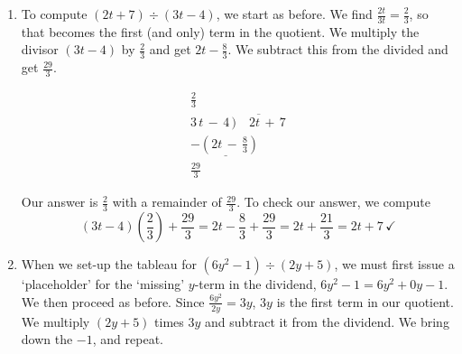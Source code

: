 \documentclass{ximera}
\begin{document}
\begin{example}
\begin{explanation}
\begin{enumerate}
Finally, we `bring down' the last term of the dividend, namely $-14$, and repeat the process.  We divide $\frac{7x}{x} = 7$, add this to the quotient, multiply it by the divisor (which yields $7(x - 2) = 7x - 14$) and subtract.

\[
\begin{array}{r}
x^2\,+\,6x\,+\,7\\
x\,-\,2 \, \overline{)\quad x^3\,+\,4x^2\,-\,5x\,-\,14} \\
 \underline{-\left(x^3\,-\,2x^2\right)} \phantom{-\,5x\,-\,14}\\
 6x^2-\,5x\phantom{\,-\,14\,}\\
  \underline{-\left(6x^2\,-\,12x\right)} \phantom{-1}\\
  \,7x\,-\,14 \\
\underline{-\left(7x\,-\,14\right)} \\
 0\,\,
\end{array}
\]

In this case, we get a quotient of $x^2 + 6x + 7$ with a remainder of $0$.  To check our answer, we compute  \[(x-2)\left(x^2 + 6x + 7\right) + 0 = x^3 + 6x^2 + 7x - 2x^2 - 12x -14 =  x^3 + 4x^2 - 5x - 14 \, \checkmark \]


\item    To compute  $\left(2t +  7\right) \div \left(3t - 4\right)$, we start as before.  We find $\frac{2t}{3t} = \frac{2}{3}$, so that becomes the first (and only) term in the quotient.  We multiply the divisor $(3t-4)$ by $\frac{2}{3}$ and get $2t - \frac{8}{3}$.  We subtract this from the divided and get $\frac{29}{3}$.

\[
\begin{array}{r}
\frac{2}{3}\\
3\,t\,-\,4 \, \overline{)\quad 2t\,+\,7} \\
 \underline{-\left(2t\,-\,\frac{8}{3}\right)\,}\\
 \frac{29}{3}\,\,\,
\end{array}
\]

Our answer is $\frac{2}{3}$ with a remainder of $\frac{29}{3}$.  To check our answer, we compute \[(3t-4) \left(\frac{2}{3}\right) + \frac{29}{3} = 2t - \frac{8}{3} + \frac{29}{3} = 2t + \frac{21}{3} = 2t + 7 \, \checkmark\]

\item When we set-up the tableau for   $\left(6y^2 - 1 \right) \div \left(2y + 5\right)$, we must first issue a `placeholder' for the `missing' $y$-term in the dividend, $6y^2 -1 = 6y^2 + 0y - 1$.  We then proceed as before.  Since $\frac{6y^2}{2y} = 3y$, $3y$ is the first term in our quotient. We multiply $(2y+5)$ times $3y$ and subtract it from the dividend.  We bring down the $-1$, and repeat.  


\end{enumerate}
\end{explanation}
\end{example}
\end{document}

